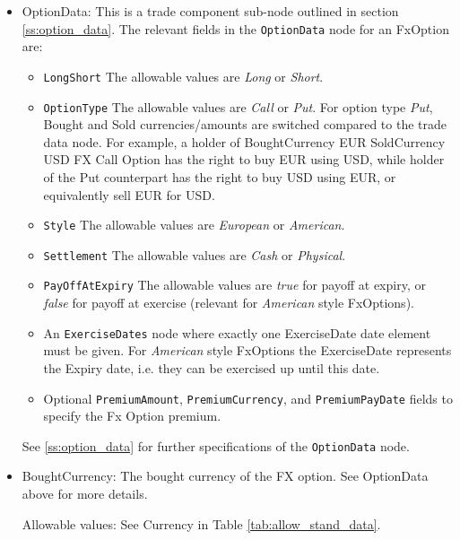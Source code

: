 \begin{itemize}
\item OptionData: This is a trade component sub-node outlined in section \ref{ss:option_data}. 
The relevant fields in the \lstinline!OptionData! node for an FxOption are:

\begin{itemize}
\item \lstinline!LongShort! The allowable values are \emph{Long} or \emph{Short}.

\item \lstinline!OptionType! The allowable values are \emph{Call} or \emph{Put}. For option type \emph{Put}, Bought and Sold currencies/amounts are switched compared to the trade data node.
For example, a holder of BoughtCurrency EUR SoldCurrency USD FX Call Option has the right to buy EUR using USD, while
holder of the Put counterpart has the right to buy USD using EUR, or equivalently sell EUR for USD.

\item  \lstinline!Style! The allowable values are \emph{European} or \emph{American}.

\item  \lstinline!Settlement! The allowable values are \emph{Cash} or \emph{Physical}.

\item \lstinline!PayOffAtExpiry! The allowable values are \emph{true} for payoff at expiry, or \emph{false} for payoff at exercise (relevant for \emph{American} style FxOptions).

\item An \lstinline!ExerciseDates! node where exactly one ExerciseDate date element must be given. For \emph{American} style FxOptions the ExerciseDate represents the Expiry date, i.e. they can be exercised up until this date. \\

\item Optional \lstinline!PremiumAmount!,  \lstinline!PremiumCurrency!, and \lstinline!PremiumPayDate! fields to specify the Fx Option premium. 

\end{itemize}

 See \ref{ss:option_data} for further specifications of the \lstinline!OptionData! node.


\item BoughtCurrency: The bought currency of the FX option. See OptionData above for more details.

Allowable values: See Currency in Table \ref{tab:allow_stand_data}.


\end{itemize}
